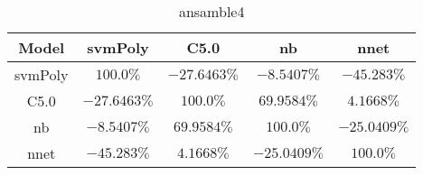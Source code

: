 \begin{table}[!ht]
	\centering
	\begin{tabular}{|c|c|c|c|c|}
		\hline
		Model & svmPoly & C5.0 & nb & nnet \\ \hline
		svmPoly & $100.0\%$ & $-27.6463\%$ & $-8.5407\%$ & $-45.283\%$ \\ \hline
		C5.0 & $-27.6463\%$ & $100.0\%$ & $69.9584\%$ & $4.1668\%$ \\ \hline
		nb & $-8.5407\%$ & $69.9584\%$ & $100.0\%$ & $-25.0409\%$ \\ \hline
		nnet & $-45.283\%$ & $4.1668\%$ & $-25.0409\%$ & $100.0\%$ \\ \hline
	\end{tabular}
	\caption{ansamble4}
	\label{tab:ansamble4}
\end{table}
